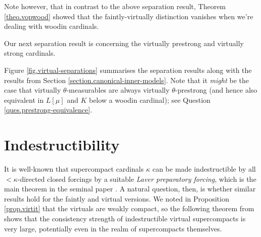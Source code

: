 \documentclass[../../main]{subfiles}
\begin{document}
Note however, that in contrast to the above separation result, Theorem \ref{theo.vopwood} showed that the faintly-virtually distinction vanishes when we're dealing with woodin cardinals.

\qquad Our next separation result is concerning the virtually prestrong and virtually strong cardinals.



\qquad Figure \ref{fig.virtual-separations} summarises the separation results along with the results from Section \ref{section.canonical-inner-models}. Note that it \textit{might} be the case that virtually $\theta$-measurables are always virtually $\theta$-prestrong (and hence also equivalent in $L[\mu]$ and $K$ below a woodin cardinal); see Question \ref{ques.prestrong-equivalence}.




\section{Indestructibility}

It is well-known that supercompact cardinals $\kappa$ can be made indestructible by all ${<}\kappa$-directed closed forcings by a suitable \textit{Laver preparatory forcing}, which is the main theorem in the seminal paper \cite{laver-indestructibility}. A natural question, then, is whether similar results hold for the faintly and virtual versions. We noted in Proposition \ref{prop.virtit} that the virtuals are weakly compact, so the following theorem from \cite{mousestack} shows that the consistency strength of indestructible virtual supercompacts is very large, potentially even in the realm of supercompacts themselves.
\end{document}
